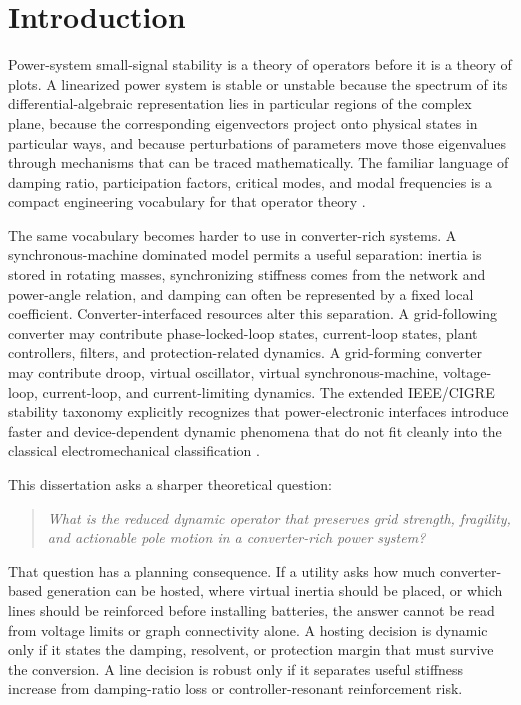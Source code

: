 \chapter{Introduction}

Power-system small-signal stability is a theory of operators before it is a
theory of plots. A linearized power system is stable or unstable because the
spectrum of its differential-algebraic representation lies in particular
regions of the complex plane, because the corresponding eigenvectors project
onto physical states in particular ways, and because perturbations of
parameters move those eigenvalues through mechanisms that can be traced
mathematically. The familiar language of damping ratio, participation factors,
critical modes, and modal frequencies is a compact engineering vocabulary for
that operator theory \cite{kundur1994power,rogers2000oscillations,kundur2004definition}.

The same vocabulary becomes harder to use in converter-rich systems. A
synchronous-machine dominated model permits a useful separation: inertia is
stored in rotating masses, synchronizing stiffness comes from the network and
power-angle relation, and damping can often be represented by a fixed local
coefficient. Converter-interfaced resources alter this separation. A
grid-following converter may contribute phase-locked-loop states, current-loop
states, plant controllers, filters, and protection-related dynamics. A
grid-forming converter may contribute droop, virtual oscillator, virtual
synchronous-machine, voltage-loop, current-loop, and current-limiting dynamics.
The extended IEEE/CIGRE stability taxonomy explicitly recognizes that
power-electronic interfaces introduce faster and device-dependent dynamic
phenomena that do not fit cleanly into the classical electromechanical
classification \cite{hatziargyriou2021stability}.

This dissertation asks a sharper theoretical question:

\begin{quote}
\itshape
What is the reduced dynamic operator that preserves grid strength, fragility,
and actionable pole motion in a converter-rich power system?
\end{quote}

That question has a planning consequence. If a utility asks how much
converter-based generation can be hosted, where virtual inertia should be
placed, or which lines should be reinforced before installing batteries, the
answer cannot be read from voltage limits or graph connectivity alone. A
hosting decision is dynamic only if it states the damping, resolvent, or
protection margin that must survive the conversion. A line decision is robust
only if it separates useful stiffness increase from damping-ratio loss or
controller-resonant reinforcement risk.

